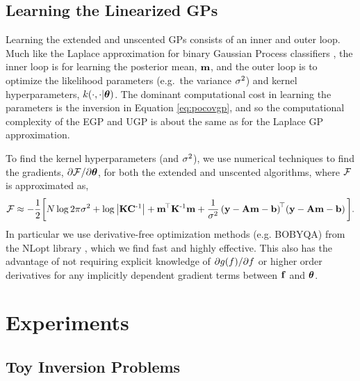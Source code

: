 \documentclass{article} %
\begin{document}
\subsection{Learning the Linearized GPs}

Learning the extended and unscented GPs consists of  an inner and outer loop.
Much like the Laplace approximation for binary Gaussian Process classifiers
\cite{Rasmussen2006}, the inner loop is for learning the posterior mean,
$\mathbf{m}$, and the outer loop is to optimize the likelihood parameters
(e.g.~the variance $\sigma^2$) and kernel hyperparameters,
$k\!\left({{\cdot}, {\cdot|\boldsymbol\theta}}\right)$. The dominant computational cost in learning
the parameters is the inversion in Equation \eqref{eq:pocovgp}, and so the
computational complexity of the EGP and UGP is about the same as for the
Laplace GP approximation.

To find the kernel hyperparameters (and $\sigma^2$), we use numerical techniques
to find the gradients, $\partial\mathcal{F}/\partial\boldsymbol\theta$, for both the extended
and unscented algorithms, where $\mathcal{F}$ is approximated as,
\begin{equation}
    \mathcal{F} \approx - \frac{1}{2} \bigg[
        N\log{2\pi\ensuremath{\sigma^2}} + \log\left|{\mathbf{K}\mathbf{C}^{\text{-}1}}\right|
    + \mathbf{m}^{\!\top}\mathbf{K}^{\text{-}1} \mathbf{m}
    + \frac{1}{\sigma^2}
        \left({\mathbf{y} - \mathbf{A}\mathbf{m} - \mathbf{b}}\right)^{\!\top}\!
        \left({\mathbf{y} - \mathbf{A}\mathbf{m} - \mathbf{b}}\right)
    \bigg].
    \label{eq:fengygp}
\end{equation}
In particular we use derivative-free optimization methods (e.g. BOBYQA)
from the NLopt library \cite{JohnsonNLOPT}, which we find fast and highly
effective. This also has the advantage of not requiring explicit knowledge of
$\partial g\!\left({{f}}\right)\!/\partial f$ or higher order derivatives for
any implicitly dependent gradient terms between $\mathbf{f}$ and $\boldsymbol\theta$. 


\section{Experiments}
\label{sec:experiments}



\subsection{Toy Inversion Problems}
\label{sec:exptoy}
\end{document}
